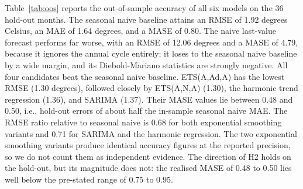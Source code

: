 \documentclass[11pt]{article}
\begin{document}
Table~\ref{tab:oos} reports the out-of-sample accuracy of all six models on the 36 hold-out months. The seasonal naive baseline attains an RMSE of 1.92 degrees Celsius, an MAE of 1.64 degrees, and a MASE of 0.80.
The naive last-value forecast performs far worse, with an RMSE of 12.06 degrees and a MASE of 4.79, because it ignores the annual cycle entirely; it loses to the seasonal naive baseline by a wide margin, and its Diebold-Mariano statistics are strongly negative.
All four candidates beat the seasonal naive baseline. ETS(A,Ad,A) has the lowest RMSE (1.30 degrees), followed closely by ETS(A,N,A) (1.30), the harmonic trend regression (1.36), and SARIMA (1.37). Their MASE values lie between 0.48 and 0.50, i.e., hold-out errors of about half the in-sample seasonal naive MAE.
The RMSE ratio relative to seasonal naive is 0.68 for both exponential smoothing variants and 0.71 for SARIMA and the harmonic regression. The two exponential smoothing variants produce identical accuracy figures at the reported precision, so we do not count them as independent evidence.
The direction of H2 holds on the hold-out, but its magnitude does not: the realised MASE of 0.48 to 0.50 lies well below the pre-stated range of 0.75 to 0.95.


\end{document}
